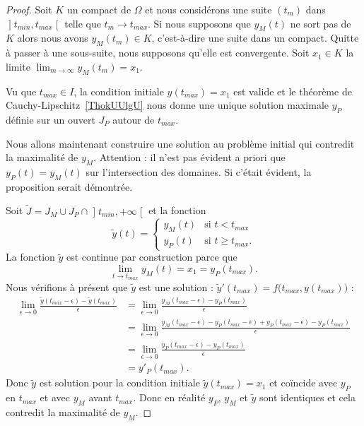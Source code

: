 \begin{proof}
Soit \( K\) un compact de \( \Omega\) et nous considérons une suite \( (t_m)\) dans \( \mathopen] t_{min} , t_{max} \mathclose[\) telle que \( t_m\to t_{max}\). Si nous supposons que \( y_M(t)\) ne sort pas de \( K\) alors nous avons \( y_M(t_m)\in K\), c'est-à-dire une suite dans un compact. Quitte à passer à une sous-suite, nous supposons qu'elle est convergente. Soit \( x_1\in K\) la limite \( \lim_{m\to \infty}y_M(t_m)=x_1\).

    Vu que \( t_{max}\in I\), la condition initiale \( y(t_{max})=x_1\) est valide et le théorème de Cauchy-Lipschitz~\ref{ThokUUlgU} nous donne une unique solution maximale \( y_P\) définie sur un ouvert \( J_P\) autour de \( t_{max}\).

    Nous allons maintenant construire une solution au problème initial qui contredit la maximalité de \( y_M\). Attention : il n'est pas évident a priori que \( y_P(t)=y_M(t)\) sur l'intersection des domaines. Si c'était évident, la proposition serait démontrée.

    Soit \( \tilde J=J_M\cup J_P\cap\mathopen] t_{min} , +\infty \mathclose[\) et la fonction
        \begin{equation}
            \tilde y(t)=\begin{cases}
                y_M(t)    &   \text{si } t<t_{max}\\
                y_P(t)    &    \text{si } t\geq t_{max}.
            \end{cases}
        \end{equation}
        La fonction \( \tilde y\) est continue par construction parce que
        \begin{equation}
            \lim_{t\to t_{max}} y_M(t)=x_1=y_P(t_{max}).
        \end{equation}
        Nous vérifions à présent que \( \tilde y\) est une solution : \( \tilde y'(t_{max})=f\big( t_{max},y(t_{max}) \big)\) :
        \begin{subequations}
            \begin{align}
                \lim_{\epsilon\to 0}\frac{ \tilde y(t_{max}-\epsilon)-\tilde y(t_{max}) }{ \epsilon }&=\lim_{\epsilon\to 0}\frac{ y_M(t_{max}-\epsilon)-y_P(t_{max}) }{ \epsilon }\\
                &=\lim_{\epsilon\to 0}\frac{ y_M(t_{max}-\epsilon)-y_P(t_{max}-\epsilon)+y_P(t_{max}-\epsilon)-y_P(t_{max}) }{ \epsilon }\\
                &=\lim_{\epsilon\to 0}\frac{ y_P(t_{max}-\epsilon)-y_P(t_{max}) }{ \epsilon }\\
                &=y'_P(t_{max}).
            \end{align}
        \end{subequations}
        Donc \( \tilde y\) est solution pour la condition initiale \( \tilde y(t_{max})=x_1\) et coïncide avec \( y_P\) en \( t_{max}\) et avec \( y_M\) avant \( t_{max}\). Donc en réalité \( y_P\), \( y_M\) et \( \tilde y\) sont identiques et cela contredit la maximalité de \( y_M\).
\end{proof}

